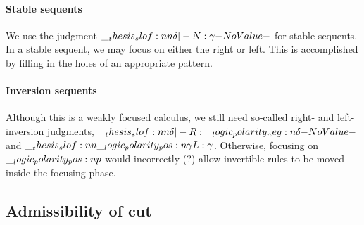 \paragraph{Stable se{q}uents}
We use the judgment $\slof{\delta |- N : \gamma}$ for stable sequents.
In a stable sequent, we may focus on either the right or left.
This is accomplished by filling in the holes of an appropriate pattern.

\paragraph{Inversion seq\-uents}
Although this is a weakly focused calculus, we still need so-called right- and left-inversion judgments, $\slof{\delta |- R : \n{\delta}}$ and $\slof{\p{\gamma} |- L : \gamma}$.
Otherwise, focusing on $\__logic_polarity_pos:n {p}$ would incorrectly (?) allow invertible rules to be moved inside the focusing phase.

\subsection{Admissibility of cut}

